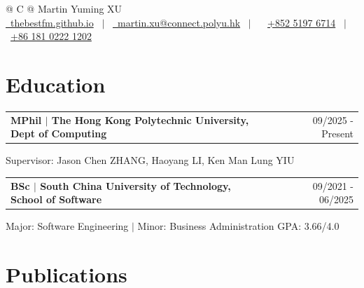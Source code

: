 \documentclass[a4paper,12pt]{article}
\makeatletter
\newenvironment{jobshort}[2]
    {
    \begin{tabularx}{\linewidth}{@{}l X r@{}}
    \textbf{#1} & \hfill &  #2 \\[3.75pt]
    \end{tabularx}
    }
    {
    }
\makeatother
\begin{document}
\pagestyle{empty} 


\begingroup
\hypersetup{urlcolor=black}
\begin{tabularx}{\linewidth}{@{} C @{}}
\Huge{Martin Yuming XU} \\[7.5pt]
\href{https://thebestfm.github.io}{\raisebox{-0.05\height}\faGithub\ thebestfm.github.io} \ $|$ \ 
\href{mailto:martin.xu@connect.polyu.hk}{\raisebox{-0.05\height}\faEnvelope \ martin.xu@connect.polyu.hk} \ $|$ \ 
\textcolor{black}{\raisebox{-0.05\height}{\small\faMobile}} \ \href{tel:+85251976714}{+852 5197 6714} \ $|$ \ \href{tel:+8618102221202}{+86 181 0222 1202} \\
\end{tabularx}
\endgroup

\section{Education}

\begin{jobshort}{MPhil $|$ The Hong Kong Polytechnic University, Dept of Computing}{09/2025 - Present}
Supervisor: Jason Chen ZHANG, Haoyang LI, Ken Man Lung YIU
\end{jobshort}

\begin{jobshort}{BSc $|$ South China University of Technology, School of Software}{09/2021 - 06/2025}
Major: Software Engineering $|$ Minor: Business Administration \hfill GPA: 3.66/4.0
\end{jobshort}

\section{Publications}
\end{document}
